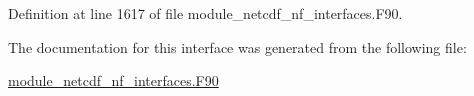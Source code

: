 Definition at line 1617 of file module\+\_\+netcdf\+\_\+nf\+\_\+interfaces.\+F90.



The documentation for this interface was generated from the following file\+:\begin{DoxyCompactItemize}
\item 
\hyperlink{module__netcdf__nf__interfaces_8F90}{module\+\_\+netcdf\+\_\+nf\+\_\+interfaces.\+F90}\end{DoxyCompactItemize}
